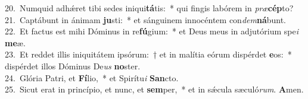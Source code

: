 {20.~}Numquid adhǽret tibi sedes iniqui\textbf{tá}tis:~* qui fingis labórem in \textit{præ}\textbf{cép}to?\\
{21.~}Captábunt in ánimam \textbf{ju}sti:~* et sánguinem innocéntem con\textit{dem}\textbf{ná}bunt.\\
{22.~}Et factus est mihi Dóminus in re\textbf{fú}gium:~* et Deus meus in adjutórium spe\textit{i} \textbf{me}æ.\\
{23.~}Et reddet illis iniquitátem ipsórum:~† et in malítia eórum dispérdet \textbf{e}os:~* dispérdet illos Dóminus De\textit{us} \textbf{no}ster.\\
{24.~}Glória Patri, et \textbf{Fí}lio,~* et Spirítu\textit{i} \textbf{San}cto.\\
{25.~}Sicut erat in princípio, et nunc, et \textbf{sem}per,~* et in sǽcula sæculó\textit{rum}. \textbf{A}men.\\
